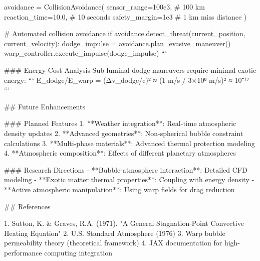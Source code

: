 avoidance = CollisionAvoidance(
    sensor_range=100e3,  # 100 km
    reaction_time=10.0,  # 10 seconds
    safety_margin=1e3    # 1 km miss distance
)

# Automated collision avoidance
if avoidance.detect_threat(current_position, current_velocity):
    dodge_impulse = avoidance.plan_evasive_maneuver()
    warp_controller.execute_impulse(dodge_impulse)
```

### Energy Cost Analysis
Sub-luminal dodge maneuvers require minimal exotic energy:
```
E_dodge/E_warp = (Δv_dodge/c)² ≈ (1 m/s / 3×10⁸ m/s)² ≈ 10⁻¹⁷
```

## Future Enhancements

### Planned Features
1. **Weather integration**: Real-time atmospheric density updates
2. **Advanced geometries**: Non-spherical bubble constraint calculations
3. **Multi-phase materials**: Advanced thermal protection modeling
4. **Atmospheric composition**: Effects of different planetary atmospheres

### Research Directions
- **Bubble-atmosphere interaction**: Detailed CFD modeling
- **Exotic matter thermal properties**: Coupling with energy density
- **Active atmospheric manipulation**: Using warp fields for drag reduction

## References

1. Sutton, K. & Graves, R.A. (1971). "A General Stagnation-Point Convective Heating Equation"
2. U.S. Standard Atmosphere (1976)
3. Warp bubble permeability theory (theoretical framework)
4. JAX documentation for high-performance computing integration
